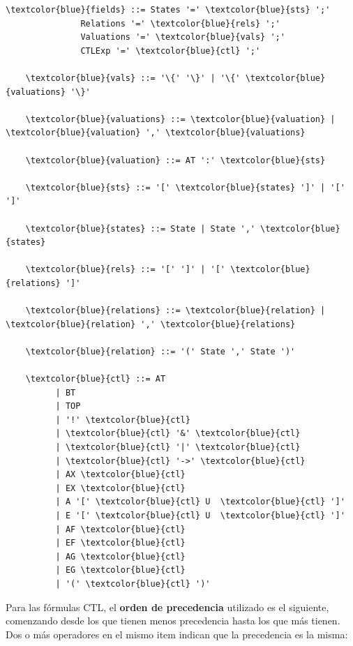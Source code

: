 \documentclass[11pt]{article}
\begin{document}
  \begin{Verbatim}[commandchars=\\\{\}]
    \textcolor{blue}{fields} ::= States '=' \textcolor{blue}{sts} ';' 
               Relations '=' \textcolor{blue}{rels} ';'
               Valuations '=' \textcolor{blue}{vals} ';'
               CTLExp '=' \textcolor{blue}{ctl} ';'

    \textcolor{blue}{vals} ::= '\{' '\}' | '\{' \textcolor{blue}{valuations} '\}'

    \textcolor{blue}{valuations} ::= \textcolor{blue}{valuation} | \textcolor{blue}{valuation} ',' \textcolor{blue}{valuations}

    \textcolor{blue}{valuation} ::= AT ':' \textcolor{blue}{sts}
    
    \textcolor{blue}{sts} ::= '[' \textcolor{blue}{states} ']' | '[' ']'

    \textcolor{blue}{states} ::= State | State ',' \textcolor{blue}{states}

    \textcolor{blue}{rels} ::= '[' ']' | '[' \textcolor{blue}{relations} ']'

    \textcolor{blue}{relations} ::= \textcolor{blue}{relation} | \textcolor{blue}{relation} ',' \textcolor{blue}{relations}

    \textcolor{blue}{relation} ::= '(' State ',' State ')'

    \textcolor{blue}{ctl} ::= AT                        
          | BT                        
          | TOP                       
          | '!' \textcolor{blue}{ctl}                  
          | \textcolor{blue}{ctl} '&' \textcolor{blue}{ctl}               
          | \textcolor{blue}{ctl} '|' \textcolor{blue}{ctl}              
          | \textcolor{blue}{ctl} '->' \textcolor{blue}{ctl}              
          | AX \textcolor{blue}{ctl}                     
          | EX \textcolor{blue}{ctl}                     
          | A '[' \textcolor{blue}{ctl} U  \textcolor{blue}{ctl} ']'                 
          | E '[' \textcolor{blue}{ctl} U  \textcolor{blue}{ctl} ']'                 
          | AF \textcolor{blue}{ctl}                     
          | EF \textcolor{blue}{ctl}                     
          | AG \textcolor{blue}{ctl}                     
          | EG \textcolor{blue}{ctl}                     
          | '(' \textcolor{blue}{ctl} ')'               

  \end{Verbatim}

  Para las fórmulas CTL, el \textbf{orden de precedencia} utilizado es el siguiente,
  comenzando desde los que tienen menos precedencia hasta los que más tienen.
  Dos o más operadores en el mismo item indican que la precedencia es la misma:
\end{document}
